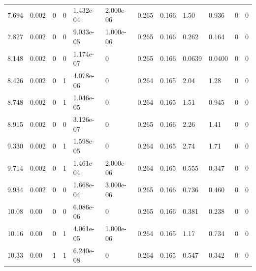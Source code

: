 \documentclass[preview]{standalone}
\begin{document}
{{\begin{tabular}{L{1.2cm}C{1.2cm} C{0.3cm}C{0.5cm} C{1.4cm}C{1.4cm} C{1.4cm}C{1.4cm} C{1.6cm}C{1.6cm} C{1.6cm}C{1.6cm}}
  7.694  &  0.002  & 0     &  0 &  1.432e-04  & 2.000e-06  &  0.265&   0.166& 1.50 & 0.936   &  0 & 0  \\ 
  7.827  &  0.002  & 0     &  0 &  9.033e-05  & 1.000e-06  &  0.265&   0.166& 0.262 & 0.164   &  0 & 0  \\ 
  8.148  &  0.002  & 0     &  0 &  1.174e-07  & 0  &  0.265&   0.166& 0.0639 & 0.0400   &  0 & 0  \\ 
  8.426  &  0.002  & 0     &  1 &  4.078e-06  & 0  &  0.264&   0.165& 2.04 & 1.28   &  0 & 0  \\ 
  8.748  &  0.002  & 0     &  1 &  1.046e-05  & 0  &  0.264&   0.165& 1.51 & 0.945   &  0 & 0  \\ 
  8.915  &  0.002  & 0     &  0 &  3.126e-07  & 0  &  0.265&   0.166& 2.26 & 1.41   &  0 & 0  \\ 
  9.330  &  0.002  & 0     &  1 &  1.598e-05  & 0  &  0.264&   0.165& 2.74 & 1.71   &  0 & 0  \\ 
  9.714  &  0.002  & 0     &  1 &  1.461e-04  & 2.000e-06  &  0.264&   0.165& 0.555 & 0.347   &  0 & 0  \\ 
  9.934  &  0.002  & 0     &  0 &  1.668e-04  & 3.000e-06  &  0.265&   0.166& 0.736 & 0.460   &  0 & 0  \\ 
  10.08  &  0.00  & 0     &  0 &  6.086e-06  & 0  &  0.265&   0.166& 0.381 & 0.238   &  0 & 0  \\ 
  10.16  &  0.00  & 0     &  1 &  4.061e-05  & 1.000e-06  &  0.264&   0.165& 1.17 & 0.734   &  0 & 0  \\ 
  10.33  &  0.00  & 1     &  1 &  6.240e-08  & 0  &  0.264&   0.165& 0.547 & 0.342   &  0 & 0  \\ 
\hline 
\end{tabular} 

}}
\end{document}
